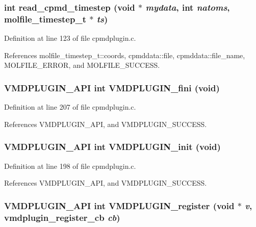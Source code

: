 \subsubsection{\setlength{\rightskip}{0pt plus 5cm}int read\_\-cpmd\_\-timestep (void $\ast$ {\em mydata}, int {\em natoms}, {\bf molfile\_\-timestep\_\-t} $\ast$ {\em ts})\hspace{0.3cm}{\tt  [static]}}\label{cpmdplugin_8c_a3}




Definition at line 123 of file cpmdplugin.c.

References molfile\_\-timestep\_\-t::coords, cpmddata::file, cpmddata::file\_\-name, MOLFILE\_\-ERROR, and MOLFILE\_\-SUCCESS.
\subsubsection{\setlength{\rightskip}{0pt plus 5cm}VMDPLUGIN\_\-API int VMDPLUGIN\_\-fini (void)}\label{cpmdplugin_8c_a7}




Definition at line 207 of file cpmdplugin.c.

References VMDPLUGIN\_\-API, and VMDPLUGIN\_\-SUCCESS.
\subsubsection{\setlength{\rightskip}{0pt plus 5cm}VMDPLUGIN\_\-API int VMDPLUGIN\_\-init (void)}\label{cpmdplugin_8c_a5}




Definition at line 198 of file cpmdplugin.c.

References VMDPLUGIN\_\-API, and VMDPLUGIN\_\-SUCCESS.
\subsubsection{\setlength{\rightskip}{0pt plus 5cm}VMDPLUGIN\_\-API int VMDPLUGIN\_\-register (void $\ast$ {\em v}, {\bf vmdplugin\_\-register\_\-cb} {\em cb})}\label{cpmdplugin_8c_a6}




